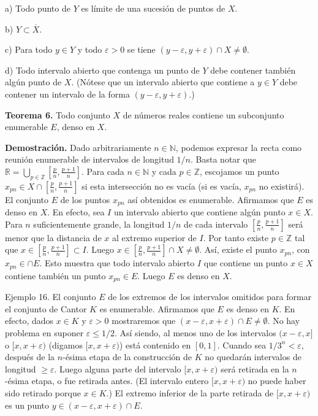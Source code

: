 \documentclass[12pt,oneside]{book}
\begin{document}
a) Todo punto de \(Y\) es límite de una sucesión de puntos de \(X\).

b) \(Y \subset \overline{X}\).

c) Para todo \(y \in Y\) y todo \(\varepsilon > 0\) se tiene \((y - \varepsilon, y + \varepsilon) \cap X \neq \emptyset\).

d) Todo intervalo abierto que contenga un punto de \(Y\) debe contener también algún punto de \(X\). (Nótese que un intervalo abierto que contiene a \(y \in Y\) debe contener un intervalo de la forma \((y - \varepsilon, y + \varepsilon)\).)

\textbf{Teorema 6.} Todo conjunto \(X\) de números reales contiene un subconjunto enumerable \(E\), denso en \(X\).

\textbf{Demostración.} Dado arbitrariamente \(n \in \mathbb{N}\), podemos expresar la recta como reunión enumerable de intervalos de longitud \(1/n\). Basta notar que \(\mathbb{R} = \bigcup_{p \in \mathbb{Z}} \left[ \frac{p}{n}, \frac{p+1}{n} \right]\). Para cada \(n \in \mathbb{N}\) y cada \(p \in \mathbb{Z}\), escojamos un punto \(x_{pn} \in X \cap \left[ \frac{p}{n}, \frac{p+1}{n} \right]\) si esta intersección no es vacía (si es vacía, \(x_{pn}\) no existirá). El conjunto \(E\) de los puntos \(x_{pn}\) así obtenidos es enumerable. Afirmamos que \(E\) es denso en \(X\). En efecto, sea \(I\) un intervalo abierto que contiene algún punto \(x \in X\). Para \(n\) suficientemente grande, la longitud \(1/n\) de cada intervalo \(\left[ \frac{p}{n}, \frac{p+1}{n} \right]\) será menor que la distancia de \(x\) al extremo superior de \(I\). Por tanto existe \(p \in \mathbb{Z}\) tal que \(x \in \left[ \frac{p}{n}, \frac{p+1}{n} \right] \subset I\). Luego \(x \in \left[ \frac{p}{n}, \frac{p+1}{n} \right] \cap X \neq \emptyset\). Así, existe el punto \(x_{pn}\), con \(x_{pn} \in \cap E\). Esto muestra que todo intervalo abierto \(I\) que contiene un punto \(x \in X\) contiene también un punto \(x_{pn} \in E\). Luego \(E\) es denso en \(X\).

Ejemplo 16. El conjunto \(E\) de los extremos de los intervalos omitidos para formar el conjunto de Cantor \(K\) es enumerable. Afirmamos que \(E\) es denso en \(K\). En efecto, dados \(x \in K\) y \(\varepsilon > 0\) mostraremos que \((x - \varepsilon, x + \varepsilon) \cap E \neq \emptyset\). No hay problema en suponer \(\varepsilon \leq 1/2\). Así siendo, al menos uno de los intervalos \((x - \varepsilon, x]\) o \([x, x + \varepsilon)\) (digamos \([x, x + \varepsilon)\)) está contenido en \([0, 1]\). Cuando sea \(1/3^n < \varepsilon\), después de la \(n\)-ésima etapa de la construcción de \(K\) no quedarán intervalos de longitud \(\geq \varepsilon\). Luego alguna parte del intervalo \([x, x + \varepsilon)\) será retirada en la \(n\)-ésima etapa, o fue retirada antes. (El intervalo entero \([x, x + \varepsilon)\) no puede haber sido retirado porque \(x \in K\).) El extremo inferior de la parte retirada de \([x, x + \varepsilon)\) es un punto \(y \in (x - \varepsilon, x + \varepsilon) \cap E\).
\end{document}
